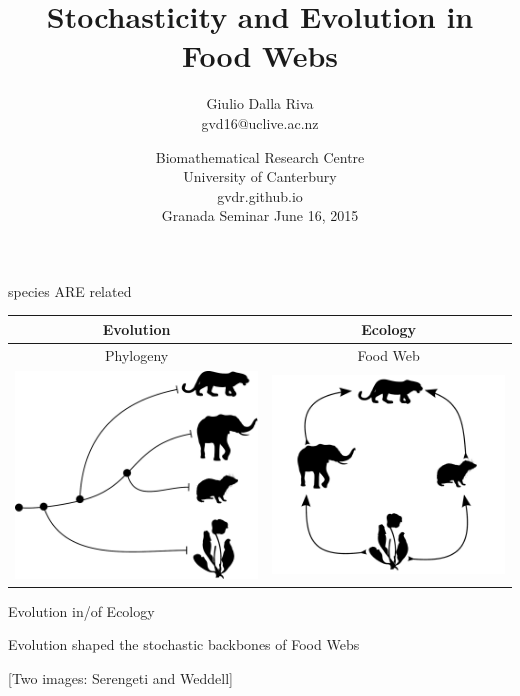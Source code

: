 \documentclass[]{beamer}
\title{Stochasticity and Evolution in Food Webs}
\author{Giulio Dalla Riva\\
\tiny{gvd16@uclive.ac.nz}\\
}
\date{  {\tiny Biomathematical Research Centre\\
  University of Canterbury\\
     gvdr.github.io\\
     \vskip 0.5cm
  }
Granada Seminar June 16, 2015}
\begin{document}
\frame{\titlepage
\addtocounter{framenumber}{-1}}

\begin{frame}{species ARE related}

\centering
\begin{tabular}{|c|c|}\hline
Evolution & Ecology \\\hline\hline
Phylogeny & Food Web \\
\includegraphics[width=0.4 \textwidth]{images/small_phylo.pdf} & \includegraphics[width=0.4 \textwidth]{images/small_fw.pdf} \\ \hline
\end{tabular}

\end{frame}

\begin{frame}{Evolution in/of Ecology}

Evolution shaped the stochastic backbones of Food Webs

{[}Two images: Serengeti and Weddell{]}

\end{frame}
\end{document}
